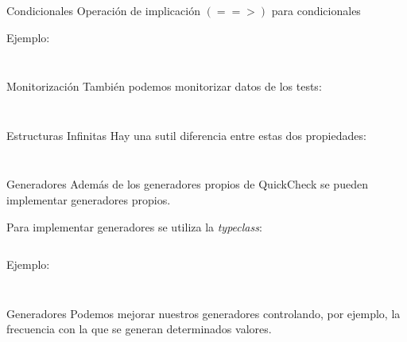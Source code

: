 \documentclass[10pt]{beamer}
\newcommand\Fontvi{\fontsize{10}{12}\selectfont}
\begin{document}
\begin{frame}{Condicionales}
  Operación de implicación $(==>)$ para condicionales

  Ejemplo:
  \inputminted{haskell}{data/max_prop.hs}
\end{frame}

\begin{frame}[standout]
  \Fontvi
  \inputminted{text}{data/pruebas_max_prop.txt}
\end{frame}

\begin{frame}{Monitorización}
  También podemos monitorizar datos de los tests:
  \inputminted{haskell}{data/monitor_test.hs}
\end{frame}

\begin{frame}[standout]
  \Fontvi
  \inputminted{text}{data/monitor_test_pruebas.txt}
\end{frame}

\begin{frame}{Estructuras Infinitas}
  Hay una sutil diferencia entre estas dos propiedades:
  \inputminted{haskell}{data/infinite.hs}
\end{frame}

\begin{frame}[standout]
  \Fontvi
  \inputminted{text}{data/infinite_prueba.txt}
\end{frame}

\begin{frame}{Generadores}
  Además de los generadores propios de QuickCheck se pueden
  implementar generadores propios.

  Para implementar generadores se
  utiliza la \textit{typeclass}:
  \inputminted{haskell}{data/arbitrary.hs}

  Ejemplo:
  \inputminted{haskell}{data/colours.hs}
\end{frame}

\begin{frame}[standout]
  \Fontvi
  \inputminted{text}{data/colours_prueba.txt}
\end{frame}

\begin{frame}{Generadores}
  Podemos mejorar nuestros generadores controlando, por ejemplo, la
  frecuencia con la que se generan determinados valores.

  \inputminted{haskell}{data/colours1.hs}
\end{frame}

\begin{frame}[standout]
  \Fontvi
  \inputminted{text}{data/colours1_prueba.txt}
\end{frame}
\end{document}
